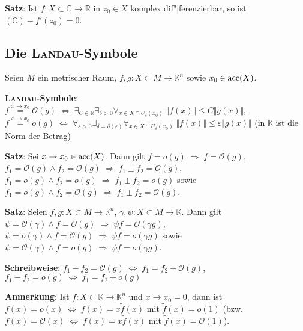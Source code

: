 \textbf{Satz}: Ist $f: X \subset \mathbb{C} \rightarrow \mathbb{R}$
in $z_0 \in X$ komplex dif"|ferenzierbar, so ist
$(\mathbb{C}) - f'(z_0) = 0$.

\subsection{%
    Die \textsc{Landau}-Symbole%
}

Seien $M$ ein metrischer Raum,
$f, g: X \subset M \rightarrow \mathbb{K}^n$
sowie $x_0 \in \operatorname{acc}(X)$.

\textbf{\textsc{Landau}-Symbole}:
$f \overset{x \to x_0}{=} \mathcal{O}(g) \;\Leftrightarrow\;
\exists_{C \in \mathbb{R}} \exists_{\delta > 0}
\forall_{x \in X \cap U_\delta(x_0)}\;
\Vert f(x) \Vert \le C \Vert g(x) \Vert$, \\
$f \overset{x \to x_0}{=} o(g) \;\Leftrightarrow\;
\forall_{\varepsilon > 0} \exists_{\delta = \delta(\varepsilon)}
\forall_{x \in X \cap U_\delta(x_0)}\;
\Vert f(x) \Vert \le \varepsilon \Vert g(x) \Vert$
\qquad (in $\mathbb{K}$ ist die Norm der Betrag)

\linie

\textbf{Satz}: Sei $x \to x_0 \in \operatorname{acc}(X)$. \qquad
Dann gilt $f = o(g) \;\Rightarrow\; f = \mathcal{O}(g)$, \\
$f_1 = \mathcal{O}(g) \land f_2 = \mathcal{O}(g) \;\Rightarrow\;
f_1 \pm f_2 = \mathcal{O}(g)$, \qquad
$f_1 = o(g) \land f_2 = o(g) \;\Rightarrow\; f_1 \pm f_2 = o(g)$ sowie
$f_1 = o(g) \land f_2 = \mathcal{O}(g) \;\Rightarrow\;
f_1 \pm f_2 = \mathcal{O}(g)$.

\textbf{Satz}: Seien $f, g: X \subset M \rightarrow \mathbb{K}^n$,
$\gamma, \psi: X \subset M \rightarrow \mathbb{K}$.
Dann gilt \\
$\psi = \mathcal{O}(\gamma) \land f = \mathcal{O}(g) \;\Rightarrow\;
\psi f = \mathcal{O}(\gamma g)$, \qquad
$\psi = o(\gamma) \land f = \mathcal{O}(g) \;\Rightarrow\;
\psi f = o(\gamma g)$ sowie \\
$\psi = \mathcal{O}(\gamma) \land f = o(g) \;\Rightarrow\;
\psi f = o(\gamma g)$.

\textbf{Schreibweise}:
$f_1 - f_2 = \mathcal{O}(g) \;\Leftrightarrow\; f_1 = f_2 + \mathcal{O}(g)$,
\qquad $f_1 - f_2 = o(g) \;\Leftrightarrow\; f_1 = f_2 + o(g)$

\textbf{Anmerkung}:
Ist $f: X \subset \mathbb{K} \rightarrow \mathbb{K}^n$ und $x \to x_0 = 0$,
dann ist $f(x) = o(x) \;\Leftrightarrow\; f(x) = x \tilde{f}(x)$
mit $\tilde{f}(x) = o(1)$ \quad
(bzw. $f(x) = \mathcal{O}(x) \;\Leftrightarrow\; f(x) = x \tilde{f}(x)$
mit $\tilde{f}(x) = \mathcal{O}(1)$).

